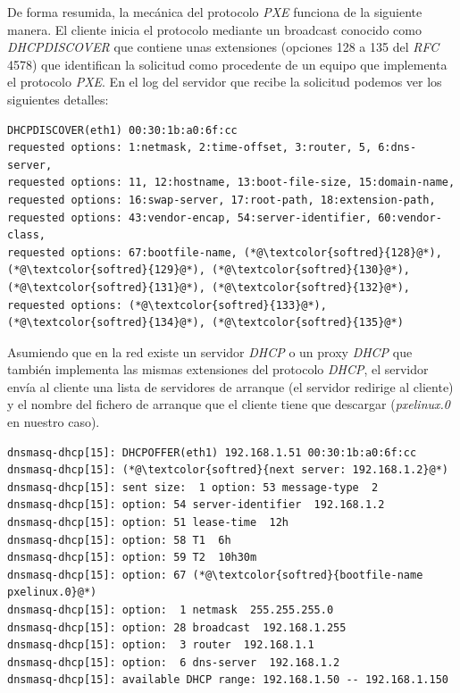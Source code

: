 \documentclass[a4paper,12pt,spanish,final]{epsc_tfc_pfc}
\begin{document}
De forma resumida, la mecánica del protocolo \emph{PXE} funciona de la siguiente manera. El cliente inicia el protocolo mediante un broadcast conocido como \emph{DHCPDISCOVER} que contiene unas extensiones (opciones 128 a 135 del \emph{RFC} 4578) que identifican la solicitud como procedente de un equipo que implementa el protocolo \emph{PXE}. En el log del servidor que recibe la solicitud podemos ver los siguientes detalles:\\

\begin{lstlisting}[style=dnsmasq]
DHCPDISCOVER(eth1) 00:30:1b:a0:6f:cc
requested options: 1:netmask, 2:time-offset, 3:router, 5, 6:dns-server,
requested options: 11, 12:hostname, 13:boot-file-size, 15:domain-name,
requested options: 16:swap-server, 17:root-path, 18:extension-path,
requested options: 43:vendor-encap, 54:server-identifier, 60:vendor-class,
requested options: 67:bootfile-name, (*@\textcolor{softred}{128}@*), (*@\textcolor{softred}{129}@*), (*@\textcolor{softred}{130}@*), (*@\textcolor{softred}{131}@*), (*@\textcolor{softred}{132}@*),
requested options: (*@\textcolor{softred}{133}@*), (*@\textcolor{softred}{134}@*), (*@\textcolor{softred}{135}@*)
\end{lstlisting}

Asumiendo que en la red existe un servidor \emph{DHCP} o un proxy \emph{DHCP} que también implementa las mismas extensiones del protocolo \emph{DHCP}, el servidor envía al cliente una lista de servidores de arranque (el servidor redirige al cliente) y el nombre del fichero de arranque que el cliente tiene que descargar (\emph{pxelinux.0} en nuestro caso).\\

\begin{lstlisting}[style=dnsmasq]
dnsmasq-dhcp[15]: DHCPOFFER(eth1) 192.168.1.51 00:30:1b:a0:6f:cc
dnsmasq-dhcp[15]: (*@\textcolor{softred}{next server: 192.168.1.2}@*)
dnsmasq-dhcp[15]: sent size:  1 option: 53 message-type  2
dnsmasq-dhcp[15]: option: 54 server-identifier  192.168.1.2
dnsmasq-dhcp[15]: option: 51 lease-time  12h
dnsmasq-dhcp[15]: option: 58 T1  6h
dnsmasq-dhcp[15]: option: 59 T2  10h30m
dnsmasq-dhcp[15]: option: 67 (*@\textcolor{softred}{bootfile-name  pxelinux.0}@*)
dnsmasq-dhcp[15]: option:  1 netmask  255.255.255.0
dnsmasq-dhcp[15]: option: 28 broadcast  192.168.1.255
dnsmasq-dhcp[15]: option:  3 router  192.168.1.1
dnsmasq-dhcp[15]: option:  6 dns-server  192.168.1.2
dnsmasq-dhcp[15]: available DHCP range: 192.168.1.50 -- 192.168.1.150
\end{lstlisting}
\end{document}
